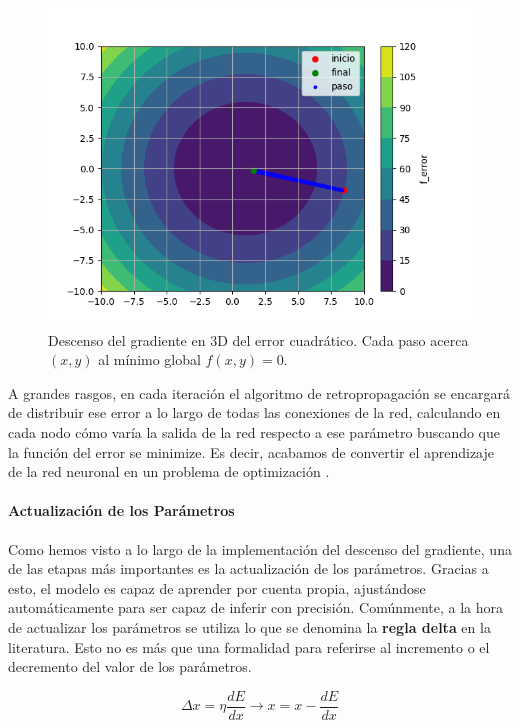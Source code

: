 \begin{figure}[htb]
	\centering
	\includegraphics[width=0.7\linewidth]{figures/ejemplos/gradient_descent_3d.png}
	\caption{Descenso del gradiente en 3D del error cuadrático. Cada paso acerca $(x,y)$ al mínimo global $f(x,y) = 0$.}
	\label{fig:descenso_gradiente_3d}
\end{figure}


A grandes rasgos, en cada iteración el algoritmo de retropropagación se encargará de distribuir ese error a lo largo de todas las conexiones de la red, calculando en cada nodo cómo varía la salida de la red respecto a ese parámetro buscando que la función del error se minimize. Es decir, acabamos de convertir el aprendizaje de la red neuronal en un problema de optimización \cite{dl__goodfellow_2016}.


\paragraph{Actualización de los Parámetros} \label{sec:actualizacion_parametros}

Como hemos visto a lo largo de la implementación del descenso del gradiente, una de las etapas más importantes es la actualización de los parámetros. Gracias a esto, el modelo es capaz de aprender por cuenta propia, ajustándose automáticamente para ser capaz de inferir con precisión. Comúnmente, a la hora de actualizar los parámetros se utiliza lo que se denomina la \textbf{regla delta} en la literatura. Esto no es más que una formalidad para referirse al incremento o el decremento del valor de los parámetros.

\begin{equation}\label{regla_delta}
	\Delta x = \eta \frac{dE}{dx} \rightarrow x = x - \frac{dE}{dx}
\end{equation}

